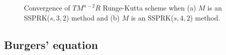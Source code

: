 \begin{figure}
	\centering
    \caption{Convergence of $TM^{n-2}R$ Runge-Kutta scheme when (a) $M$ 
    is an SSPRK($s,3,2$) method and (b) $ M $ is an SSPRK($s,4,2$) method.}
    \label{fig:conv_study}
\end{figure}


\subsection{Burgers' equation}\label{subsubsec:burgers}

